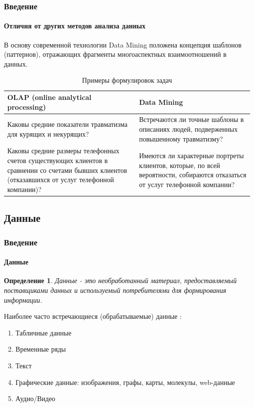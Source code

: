 \documentclass[xcolor=table]{beamer}
\newtheorem{defn}{Определение}
\begin{document}
\begin{frame}
  \frametitle{Введение}
  \framesubtitle{Отличия от других методов анализа данных}
  В основу современной технологии Data Mining положена концепция шаблонов (паттернов), отражающих фрагменты многоаспектных взаимоотношений в данных.

  \vspace{-15pt}

  \begin{table}
    \caption{Примеры формулировок задач}
    \vspace{-10pt}
    \begin{tabular}{|p{}|p{}|}
      \hline
      \cellcolor{cell1} OLAP (online analytical processing) & \cellcolor{cell2} Data Mining \\ \hline
      \cellcolor{cell1} Каковы средние показатели травматизма для курящих и некурящих? & \cellcolor{cell2} Встречаются ли точные
      шаблоны в описаниях людей, подверженных повышенному травматизму? \\ \hline
      \cellcolor{cell1} Каковы средние размеры телефонных счетов существующих клиентов в сравнении со счетами бывших клиентов (отказавшихся от услуг телефонной компании)? &
      \cellcolor{cell2} Имеются ли характерные портреты клиентов, которые, по всей вероятности, собираются отказаться от услуг телефонной компании? \\
      \hline
    \end{tabular}
  \end{table}
\end{frame}

\subsection{Данные}

\begin{frame}
  \frametitle{Введение}
  \framesubtitle{Данные}
  
  \begin{defn}
    Данные - это необработанный материал, предоставляемый поставщиками \emph{данных} и используемый потребителями для формирования информации.
  \end{defn}

  Наиболее часто встречающиеся (обрабатываемые) данные \footnotemark:
  \begin{enumerate}
    \item Табличные данные
    \item Временные ряды
    \item Текст
    \item Графические данные: изображения, графы, карты, молекулы, web-данные
    \item Аудио/Видео
  \end{enumerate}

\end{frame}
\end{document}
